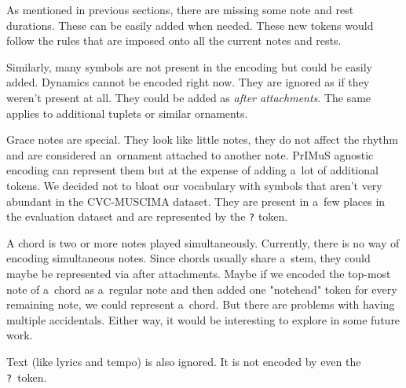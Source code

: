 As mentioned in previous sections, there are missing some note and rest durations. These can be easily added when needed. These new tokens would follow the rules that are imposed onto all the current notes and rests.

Similarly, many symbols are not present in the encoding but could be easily added. Dynamics cannot be encoded right now. They are ignored as if they weren't present at all. They could be added as \emph{after attachments}. The same applies to additional tuplets or similar ornaments.

Grace notes are special. They look like little notes, they do not affect the rhythm and are considered an~ornament attached to another note. PrIMuS agnostic encoding can represent them but at the expense of adding a~lot of additional tokens. We decided not to bloat our vocabulary with symbols that aren't very abundant in the CVC-MUSCIMA dataset. They are present in a~few places in the evaluation dataset and are represented by the \verb`?` token.

A chord is two or more notes played simultaneously. Currently, there is no way of encoding simultaneous notes. Since chords usually share a~stem, they could maybe be represented via after attachments. Maybe if we encoded the top-most note of a~chord as a~regular note and then added one "notehead" token for every remaining note, we could represent a~chord. But there are problems with having multiple accidentals. Either way, it would be interesting to explore in some future work.

Text (like lyrics and tempo) is also ignored. It is not encoded by even the \verb`?`~token.
